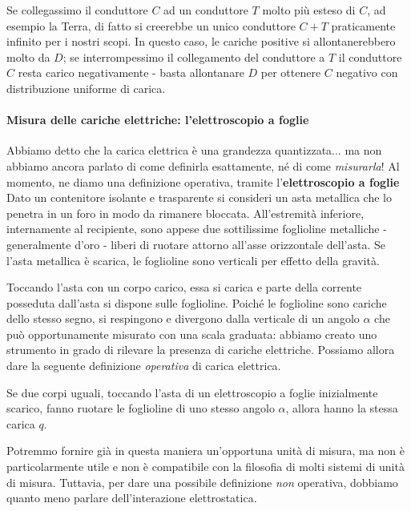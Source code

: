 Se collegassimo il conduttore $C$ ad un conduttore $T$ molto più esteso di $C$, ad esempio la Terra, di fatto si creerebbe un unico conduttore $C+T$ praticamente infinito per i nostri scopi. In questo caso, le cariche positive si allontanerebbero molto da $D$; se interrompessimo il collegamento del conduttore a $T$ il conduttore $C$ resta carico negativamente - basta allontanare $D$ per ottenere $C$ negativo con distribuzione uniforme di carica.
\paragraph{Misura delle cariche elettriche: l'elettroscopio a foglie}
Abbiamo detto che la carica elettrica è una grandezza quantizzata... ma non abbiamo ancora parlato di come definirla esattamente, né di come \textit{misurarla}! Al momento, ne diamo una definizione operativa, tramite l'\textbf{elettroscopio a foglie}\\
Dato un contenitore isolante e trasparente si consideri un asta metallica che lo penetra in un foro in modo da rimanere bloccata. All'estremità inferiore, internamente al recipiente, sono appese due sottilissime foglioline metalliche - generalmente d'oro - liberi di ruotare attorno all'asse orizzontale dell'asta. Se l'asta metallica è scarica, le foglioline sono verticali per effetto della gravità.

Toccando l'asta con un corpo carico, essa si carica e parte della corrente posseduta dall'asta si dispone sulle foglioline. Poiché le foglioline sono cariche dello stesso segno, si respingono e divergono dalla verticale di un angolo $\alpha$ che può opportunamente misurato con una scala graduata: abbiamo creato uno strumento in grado di rilevare la presenza di cariche elettriche. Possiamo allora dare la seguente definizione \textit{operativa} di carica elettrica.
\begin{define}
Se due corpi uguali, toccando l'asta di un elettroscopio a foglie inizialmente scarico, fanno ruotare le foglioline di uno stesso angolo $\alpha$, allora hanno la stessa carica $q$.
\end{define}
Potremmo fornire già in questa maniera un'opportuna unità di misura, ma non è particolarmente utile e non è compatibile con la filosofia di molti sistemi di unità di misura. Tuttavia, per dare una possibile definizione \textit{non} operativa, dobbiamo quanto meno parlare dell'interazione elettrostatica.
